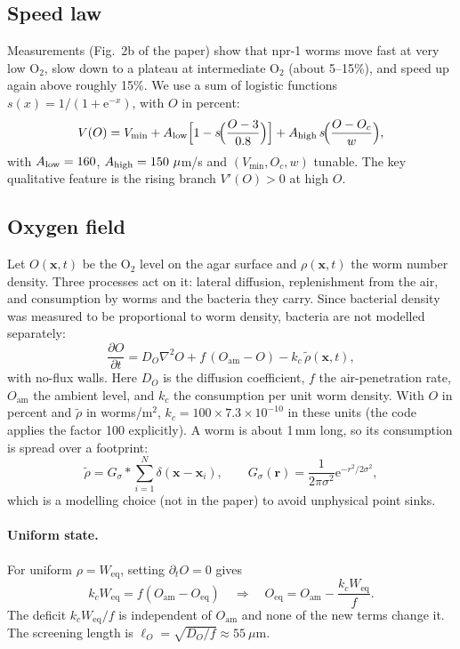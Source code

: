 \documentclass[11pt,a4paper]{article}
\newcommand{\ee}{\mathrm{e}}
\newcommand{\vect}[1]{\bm{#1}}
\newcommand{\Oam}{O_{\mathrm{am}}}
\newcommand{\Oeq}{O_{\mathrm{eq}}}
\newcommand{\Weq}{W_{\mathrm{eq}}}
\begin{document}
\subsection{Speed law}
Measurements (Fig.~2b of the paper) show that npr-1 worms move fast at very low O$_2$, slow down to a plateau at intermediate O$_2$ (about 5--15\%), and speed up again above roughly 15\%. We use a sum of logistic functions $s(x)=1/(1+\ee^{-x})$, with $O$ in percent:
\begin{equation}
V(O)=V_{\min}+A_{\rm low}\Big[1-s\!\Big(\frac{O-3}{0.8}\Big)\Big]+A_{\rm high}\,s\!\Big(\frac{O-O_c}{w}\Big),
\label{eq:V}
\end{equation}
with $A_{\rm low}=160$, $A_{\rm high}=150~\mu$m/s and $(V_{\min},O_c,w)$ tunable. The key qualitative feature is the rising branch $V'(O)>0$ at high $O$.

\subsection{Oxygen field}
Let $O(\vect{x},t)$ be the O$_2$ level on the agar surface and $\rho(\vect{x},t)$ the worm number density. Three processes act on it: lateral diffusion, replenishment from the air, and consumption by worms and the bacteria they carry. Since bacterial density was measured to be proportional to worm density, bacteria are not modelled separately:
\begin{equation}
\frac{\partial O}{\partial t}=D_O\nabla^2O+f\,(\Oam-O)-k_c\,\tilde\rho(\vect{x},t),
\label{eq:oxygen}
\end{equation}
with no-flux walls. Here $D_O$ is the diffusion coefficient, $f$ the air-penetration rate, $\Oam$ the ambient level, and $k_c$ the consumption per unit worm density. With $O$ in percent and $\tilde\rho$ in worms/m$^2$, $k_c=100\times7.3\times10^{-10}$ in these units (the code applies the factor 100 explicitly). A worm is about 1\,mm long, so its consumption is spread over a footprint:
\begin{equation}
\tilde\rho=G_\sigma*\sum_{i=1}^{N}\delta(\vect{x}-\vect{x}_i),\qquad
G_\sigma(\vect{r})=\frac{1}{2\pi\sigma^2}\ee^{-r^2/2\sigma^2},
\label{eq:footprint}
\end{equation}
which is a modelling choice (not in the paper) to avoid unphysical point sinks.

\paragraph{Uniform state.}
For uniform $\rho=\Weq$, setting $\partial_tO=0$ gives
\begin{equation}
k_c\Weq=f(\Oam-\Oeq)\quad\Longrightarrow\quad\Oeq=\Oam-\frac{k_c\Weq}{f}.
\label{eq:eq}
\end{equation}
The deficit $k_c\Weq/f$ is independent of $\Oam$ and none of the new terms change it. The screening length is $\ell_O=\sqrt{D_O/f}\approx55~\mu$m.
\end{document}
